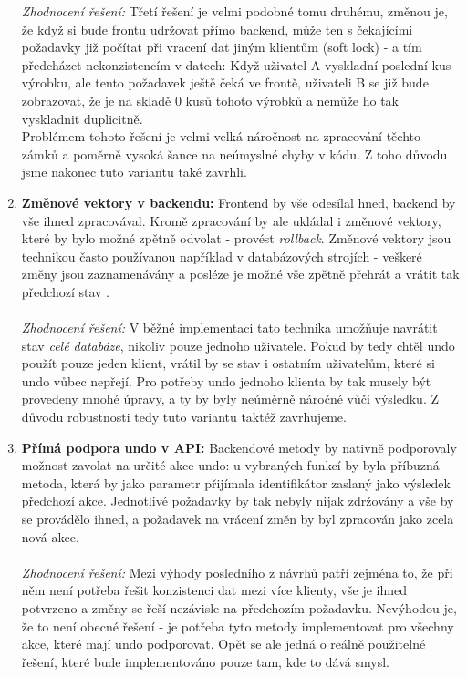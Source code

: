 \begin{enumerate}
	\emph{Zhodnocení řešení:} Třetí řešení je velmi podobné tomu druhému, změnou je, že když si bude frontu udržovat přímo backend, může ten s čekajícími požadavky již počítat při vracení dat jiným klientům (soft lock) - a tím předcházet nekonzistencím v datech: Když uživatel A vyskladní poslední kus výrobku, ale tento požadavek ještě čeká ve frontě, uživateli B se již bude zobrazovat, že je na skladě 0 kusů tohoto výrobků a nemůže ho tak vyskladnit duplicitně.\\
	Problémem tohoto řešení je velmi velká náročnost na zpracování těchto zámků a poměrně vysoká šance na neúmyslné chyby v kódu. Z toho důvodu jsme nakonec tuto variantu také zavrhli.
	\item \textbf{Změnové vektory v backendu:} Frontend by vše odesílal hned, backend by vše ihned zpracovával. Kromě zpracování by ale ukládal i změnové vektory, které by bylo možné zpětně odvolat - provést \emph{rollback}. Změnové vektory jsou technikou často používanou například v databázových strojích - veškeré změny jsou zaznamenávány a posléze je možné vše zpětně přehrát a vrátit tak předchozí stav \cite{valenta-db}.\\\\
	\emph{Zhodnocení řešení:} V běžné implementaci tato technika umožňuje navrátit stav \emph{celé databáze}, nikoliv pouze jednoho uživatele. Pokud by tedy chtěl undo použít pouze jeden klient, vrátil by se stav i ostatním uživatelům, které si undo vůbec nepřejí. Pro potřeby undo jednoho klienta by tak musely být provedeny mnohé úpravy, a ty by byly neúměrně náročné vůči výsledku. Z důvodu robustnosti tedy tuto variantu taktéž zavrhujeme.
	\item \textbf{Přímá podpora undo v API:} Backendové metody by nativně podporovaly možnost zavolat na určité akce undo: u vybraných funkcí by byla příbuzná metoda, která by jako parametr přijímala identifikátor zaslaný jako výsledek předchozí akce. Jednotlivé požadavky by tak nebyly nijak zdržovány a vše by se provádělo ihned, a požadavek na vrácení změn by byl zpracován jako zcela nová akce.\\\\
	\emph{Zhodnocení řešení:} Mezi výhody posledního z návrhů patří zejména to, že při něm není potřeba řešit konzistenci dat mezi více klienty, vše je ihned potvrzeno a změny se řeší nezávisle na předchozím požadavku. Nevýhodou je, že to není obecné řešení - je potřeba tyto metody implementovat pro všechny akce, které mají undo podporovat. Opět se ale jedná o reálně použitelné řešení, které bude implementováno pouze tam, kde to dává smysl.
\end{enumerate}


